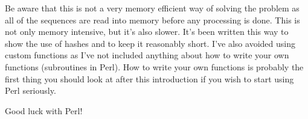 \documentclass[11pt]{article}
\begin{document}
Be aware that this is not a very memory efficient way of solving the
problem as all of the sequences are read into memory before any
processing is done. This is not only memory intensive, but it's also
slower. It's been written this way to show the use of hashes and to keep
it reasonably short. I've also avoided using custom functions as I've
not included anything about how to write your own functions (subroutines
in Perl). How to write your own functions is probably the first thing
you should look at after this introduction if you wish to start using
Perl seriously.

Good luck with Perl!
\end{document}
